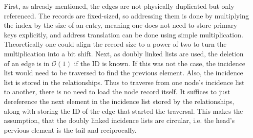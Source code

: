             First, as already mentioned, the edges are not physically duplicated but only referenced. 
            The records are fixed-sized, so addressing them is done by multiplying the index by the size of an entry, meaning one does not need to store primary keys explicitly, and address translation can be done using simple multiplication. 
            Theoretically one could align the record size to a power of two to turn the multiplication into a bit shift.
            Next, as doubly linked lists are used, the deletion of an edge is in $\mathcal{O}(1)$ if the ID is known.
            If this was not the case, the incidence list would need to be traversed to find the previous element.
            Also, the incidence list is stored in the relationships.
            Thus to traverse from one node's incidence list to another, there is no need to load the node record itself.
            It suffices to just dereference the next element in the incidence list stored by the relationships, along with storing the ID of the edge that started the traversal.
            This makes the assumption, that the doubly linked incidence lists are circular, i.e. the head's pervious element is the tail and reciprocally.

